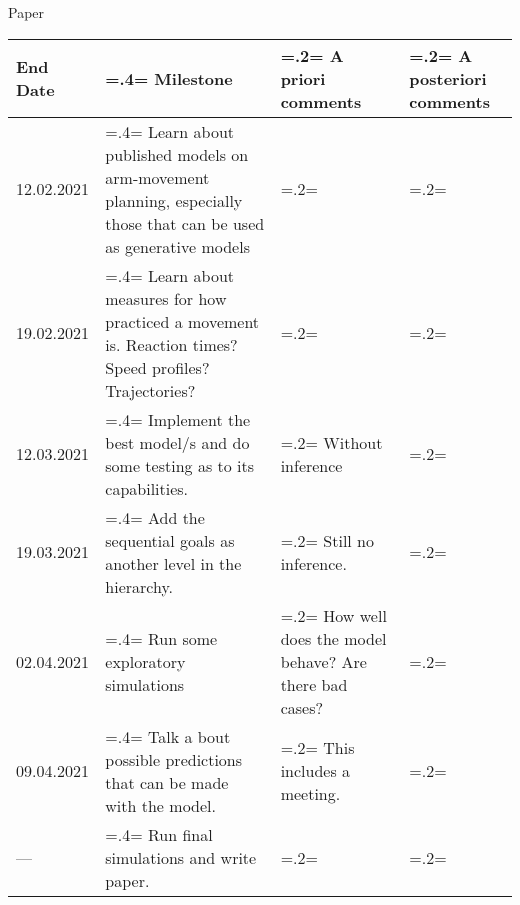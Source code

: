 \documentclass{report}
\begin{document}
\begin{chapter}{Paper}
\begin{tabularx}{\textwidth}{
  l|
  >{\hsize=.4\hsize\linewidth=\hsize}X|
  >{\hsize=.2\hsize\linewidth=\hsize}X|
  >{\hsize=.2\hsize\linewidth=\hsize}X}
End Date & Milestone & A priori comments & A posteriori comments \\ \hline \hline
12.02.2021 & Learn about published models on arm-movement planning, especially those that can be used as generative models & & \\ \hline
19.02.2021 & Learn about measures for how practiced a movement is. Reaction times? Speed profiles? Trajectories? & & \\\hline
12.03.2021 & Implement the best model/s and do some testing as to its capabilities. & Without inference &   \\ \hline
19.03.2021 & Add the sequential goals as another level in the hierarchy. & Still no inference. & \\ \hline
02.04.2021 & Run some exploratory simulations & How well does the model behave? Are there bad cases? & \\ \hline
09.04.2021 & Talk a  bout possible predictions that can be made with the model. & This includes a meeting. & \\ \hline
--- & Run final simulations and write paper. & & \\ \hline

\end{tabularx}


\end{chapter}

\end{document}
